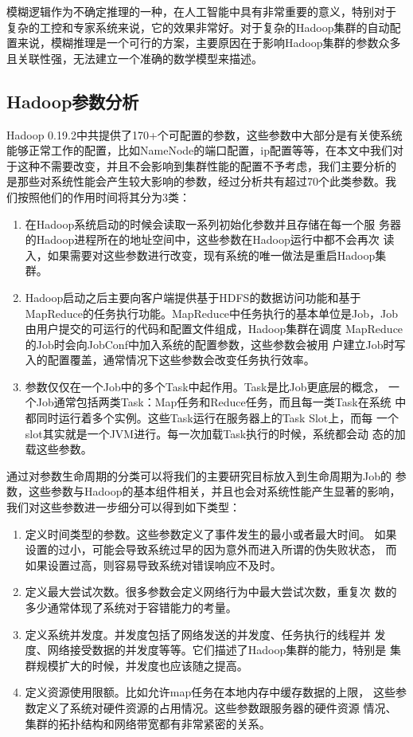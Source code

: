 模糊逻辑作为不确定推理的一种，在人工智能中具有非常重要的意义，特别对于
复杂的工控和专家系统来说，它的效果非常好。对于复杂的Hadoop集群的自动配
置来说，模糊推理是一个可行的方案，主要原因在于影响Hadoop集群的参数众多
且关联性强，无法建立一个准确的数学模型来描述。

\subsection{Hadoop参数分析}

Hadoop 0.19.2中共提供了170+个可配置的参数，这些参数中大部分是有关使系统
能够正常工作的配置，比如NameNode的端口配置，ip配置等等，在本文中我们对
于这种不需要改变，并且不会影响到集群性能的配置不予考虑，我们主要分析的
是那些对系统性能会产生较大影响的参数，经过分析共有超过70个此类参数。我
们按照他们的作用时间将其分为3类：
\begin{enumerate}
  \item 在Hadoop系统启动的时候会读取一系列初始化参数并且存储在每一个服
    务器的Hadoop进程所在的地址空间中，这些参数在Hadoop运行中都不会再次
    读入，如果需要对这些参数进行改变，现有系统的唯一做法是重启Hadoop集
    群。
  \item Hadoop启动之后主要向客户端提供基于HDFS的数据访问功能和基于
    MapReduce的任务执行功能。MapReduce中任务执行的基本单位是Job，Job
    由用户提交的可运行的代码和配置文件组成，Hadoop集群在调度
    MapReduce的Job时会向JobConf中加入系统的配置参数，这些参数会被用
    户建立Job时写入的配置覆盖，通常情况下这些参数会改变任务执行效率。
  \item 参数仅仅在一个Job中的多个Task中起作用。Task是比Job更底层的概念，
    一个Job通常包括两类Task：Map任务和Reduce任务，而且每一类Task在系统
    中都同时运行着多个实例。这些Task运行在服务器上的Task Slot上，而每
    一个slot其实就是一个JVM进行。每一次加载Task执行的时候，系统都会动
    态的加载这些参数。
\end{enumerate}

通过对参数生命周期的分类可以将我们的主要研究目标放入到生命周期为Job的
参数，这些参数与Hadoop的基本组件相关，并且也会对系统性能产生显著的影响，
我们对这些参数进一步细分可以得到如下类型：
\begin{enumerate}
  \item 定义时间类型的参数。这些参数定义了事件发生的最小或者最大时间。
    如果设置的过小，可能会导致系统过早的因为意外而进入所谓的伪失败状态，
    而如果设置过高，则容易导致系统对错误响应不及时。
  \item 定义最大尝试次数。很多参数会定义网络行为中最大尝试次数，重复次
    数的多少通常体现了系统对于容错能力的考量。
  \item 定义系统并发度。并发度包括了网络发送的并发度、任务执行的线程并
    发度、网络接受数据的并发度等等。它们描述了Hadoop集群的能力，特别是
    集群规模扩大的时候，并发度也应该随之提高。
  \item 定义资源使用限额。比如允许map任务在本地内存中缓存数据的上限，
    这些参数定义了系统对硬件资源的占用情况。这些参数跟服务器的硬件资源
    情况、集群的拓扑结构和网络带宽都有非常紧密的关系。
\end{enumerate}

